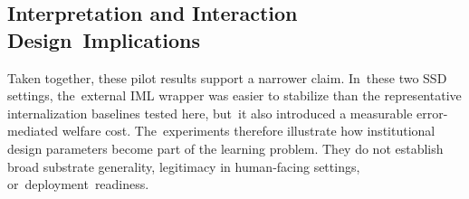 \documentclass[mca,article,accept,pdftex,oneauthor]{Definitions/mdpi}
\begin{document}
\begin{table}[H]
\caption[Held-out evaluation summary]{\hl{Held-out} %
 evaluation summary (mean $\pm$ std over 5 training seeds). Each entry reports the per-policy evaluation mean aggregated across seeds. For readability, this table reports Baseline, Social Influence, and IML (Full) in both environments. Bold indicates best per environment.}
\label{tab:episode_metrics}
\footnotesize
\end{table}


\subsection{Interpretation and Interaction Design~Implications}

Taken together, these pilot results support a narrower claim. In~these two SSD settings, the~external IML wrapper was easier to stabilize than the representative internalization baselines tested here, but~it also introduced a measurable error-mediated welfare cost. The~experiments therefore illustrate how institutional design parameters become part of the learning problem. They do not establish broad substrate generality, legitimacy in human-facing settings, or~deployment~readiness.
\end{document}
